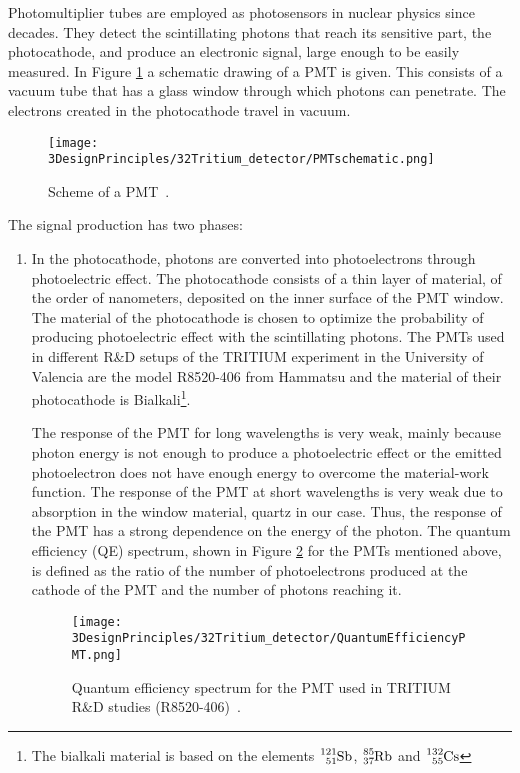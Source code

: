 Photomultiplier tubes are employed as photosensors in nuclear physics since decades. They detect the scintillating photons that reach its sensitive part, the photocathode, and produce an electronic signal, large enough to be easily measured. In Figure \ref{fig:SchemePMT} a schematic drawing of a PMT is given. This consists of a vacuum tube that has a glass window through which photons can penetrate. The electrons created in the photocathode travel in vacuum. 

\begin{figure}[htbp]
\centering
\texttt{[image: 3DesignPrinciples/32Tritium\_detector/PMTschematic.png]}
\caption{Scheme of a PMT\label{fig:SchemePMT}~\cite{Knoll}.}
\end{figure}

The signal production has two phases:
\begin{enumerate}
\item{} In the photocathode, photons are converted into photoelectrons through photoelectric effect. The photocathode consists of a thin layer of material, of the order of nanometers, deposited on the inner surface of the PMT window. The material of the photocathode is chosen to optimize the probability of producing photoelectric effect with the scintillating photons. The PMTs used in different R\&D setups of the TRITIUM experiment in the University of Valencia are the model R8520-406 from Hammatsu \cite{DataSheetPMTs} and the material of their photocathode is Bialkali\footnote{The bialkali material is based on the elements $\ce{^{121}_{51}Sb}$, $\ce{^{85}_{37}Rb}$ and $\ce{^{132}_{55}Cs}$}.

The response of the PMT for long wavelengths is very weak, mainly because photon energy is not enough to produce a photoelectric effect or the emitted photoelectron does not have enough energy to overcome the material-work function. The response of the PMT at short wavelengths is very weak due to absorption in the window material, quartz in our case. Thus, the response of the PMT has a strong dependence on the energy of the photon. The quantum efficiency (QE)  spectrum, shown in Figure \ref{fig:QuantumEfficiencyPMT} for the PMTs mentioned above, is defined as the ratio of the number of photoelectrons produced at the cathode of the PMT and the number of photons reaching it.

\begin{figure}[htbp]
\centering
\texttt{[image: 3DesignPrinciples/32Tritium\_detector/QuantumEfficiencyPMT.png]}
\caption{Quantum efficiency spectrum for the PMT used in TRITIUM R\&D studies (R8520-406)\label{fig:QuantumEfficiencyPMT}~\cite{DataSheetPMTs}.}
\end{figure}


\end{enumerate}
